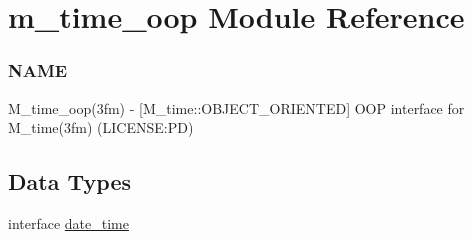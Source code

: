 \hypertarget{namespacem__time__oop}{}\section{m\+\_\+time\+\_\+oop Module Reference}
\label{namespacem__time__oop}


\subsubsection*{N\+A\+ME}

M\+\_\+time\+\_\+oop(3fm) -\/ \mbox{[}M\+\_\+time\+::\+O\+B\+J\+E\+C\+T\+\_\+\+O\+R\+I\+E\+N\+T\+ED\mbox{]} O\+OP interface for M\+\_\+time(3fm) (L\+I\+C\+E\+N\+SE\+:PD)  


\subsection*{Data Types}
\begin{DoxyCompactItemize}
\item 
interface \mbox{\hyperlink{structm__time__oop_1_1date__time}{date\+\_\+time}}
\end{DoxyCompactItemize}
